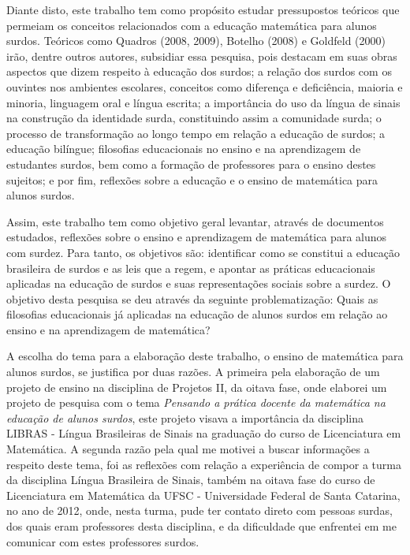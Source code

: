 \documentclass[brasil]{abnt}
\begin{document}
	Diante disto, este trabalho tem como propósito estudar pressupostos teóricos que permeiam os conceitos relacionados com a educação matemática para alunos surdos. Teóricos como Quadros (2008, 2009), Botelho (2008) e
	Goldfeld (2000) irão, dentre outros autores, subsidiar essa pesquisa, pois destacam em suas obras aspectos que dizem respeito à educação dos surdos; a relação dos surdos com os ouvintes nos ambientes 
	escolares, conceitos como diferença e deficiência, maioria e minoria, linguagem oral e língua escrita; a importância do uso da língua de sinais na construção da identidade surda, constituindo assim a comunidade
	surda; o processo de transformação ao longo tempo em relação a educação de surdos; a educação bilíngue; filosofias educacionais no ensino e na aprendizagem de estudantes surdos, bem como a formação de professores para 
	o ensino destes sujeitos; e por fim, reflexões sobre a educação e o ensino de matemática para alunos surdos. 
	
	Assim, este trabalho tem como objetivo geral levantar, através de documentos estudados, reflexões sobre o ensino e aprendizagem de matemática para alunos com surdez. 
	Para tanto, os objetivos são: identificar como se constitui a educação brasileira de surdos e as leis que a regem, e apontar as práticas educacionais aplicadas na educação de surdos e suas representações sociais sobre a 
	surdez. O objetivo desta pesquisa se deu através da seguinte problematização: Quais as filosofias educacionais já aplicadas na educação de alunos surdos em relação ao ensino e na aprendizagem de matemática?  
	
	A escolha do tema para a elaboração deste trabalho, o ensino de matemática para alunos surdos, se justifica por duas razões. A primeira pela elaboração de um projeto de ensino na 
	disciplina de Projetos II, da oitava fase, onde elaborei um projeto de pesquisa com o tema \textit{Pensando a prática docente da matemática na educação de alunos surdos}, este projeto visava a importância 
	da disciplina LIBRAS - Língua Brasileiras de Sinais na graduação do curso de Licenciatura em Matemática. A segunda razão pela qual me motivei a buscar informações a respeito deste tema, foi as reflexões 
	com relação a experiência de compor a turma da disciplina Língua Brasileira de Sinais, também na oitava fase do curso de Licenciatura em Matemática da UFSC - Universidade Federal de Santa Catarina, no ano 
	de 2012, onde, nesta turma, pude ter contato direto com pessoas surdas, dos quais eram professores desta disciplina, e da dificuldade que enfrentei em me comunicar com estes professores surdos. 
	
\end{document}
